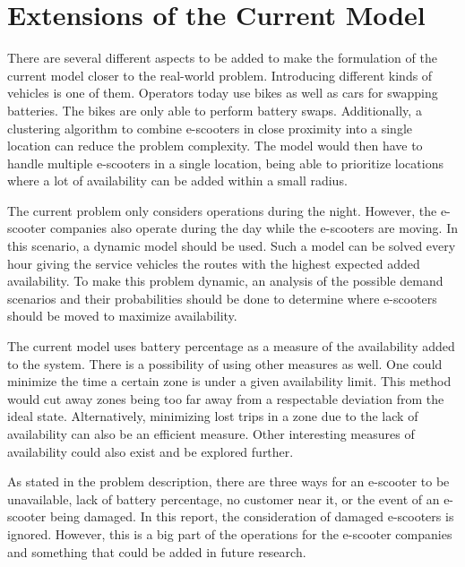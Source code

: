 \section{Extensions of the Current Model}\label{extensions of the current model}
There are several different aspects to be added to make the formulation of the current model closer to the real-world problem. Introducing different kinds of vehicles is one of them. Operators today use bikes as well as cars for swapping batteries. The bikes are only able to perform battery swaps. Additionally, a clustering algorithm to combine e-scooters in close proximity into a single location can reduce the problem complexity. The model would then have to handle multiple e-scooters in a single location, being able to prioritize locations where a lot of availability can be added within a small radius.

The current problem only considers operations during the night. However, the e-scooter companies also operate during the day while the e-scooters are moving. In this scenario, a dynamic model should be used. Such a model can be solved every hour giving the service vehicles the routes with the highest expected added availability. To make this problem dynamic, an analysis of the possible demand scenarios and their probabilities should be done to determine where e-scooters should be moved to maximize availability.

The current model uses battery percentage as a measure of the availability added to the system. There is a possibility of using other measures as well. One could minimize the time a certain zone is under a given availability limit. This method would cut away zones being too far away from a respectable deviation from the ideal state. Alternatively, minimizing lost trips in a zone due to the lack of availability can also be an efficient measure. Other interesting measures of availability could also exist and be explored further.

As stated in the problem description, there are three ways for an e-scooter to be unavailable, lack of battery percentage, no customer near it, or the event of an e-scooter being damaged. In this report, the consideration of damaged e-scooters is ignored. However, this is a big part of the operations for the e-scooter companies and something that could be added in future research. 

